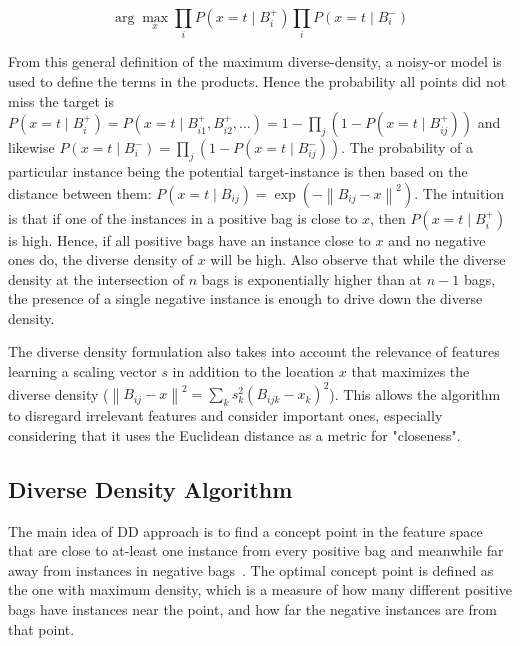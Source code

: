 \documentclass[conference,compsoc]{IEEEtran}
\begin{document}
\begin{equation}
\arg\max_x \prod_i P(x = t \mid B_i^+) \prod_i P(x = t \mid B_i^-)
\end{equation}

From this general definition of the maximum diverse-density, a noisy-or model is used to define the terms in the products. Hence the probability all points did not miss the target is $P(x = t \mid B_i^+) = P(x = t \mid B^+_{i1}, B^+_{i2}, \dots) = 1 - \prod_j(1 - P(x =t \mid B^+_{ij}))$ and likewise $P(x = t \mid B_i^-) = \prod_j(1 - P(x = t \mid B_{ij}^-))$. The probability of a particular instance being the potential target-instance is then based on the distance between them: $P(x = t \mid B_{ij}) = \exp(- \left\| B_{ij} - x \right\|^2)$. The intuition is that if one of the instances in a positive bag is close to $x$, then $P(x = t \mid B_i^+)$ is high. Hence, if all positive bags have an instance close to $x$ and no negative ones do, the diverse density of $x$ will be high. Also observe that while the diverse density at the intersection of $n$ bags is exponentially higher than at $n - 1$ bags, the presence of a single negative instance is enough to drive down the diverse density.

The diverse density formulation also takes into account the relevance of features learning a scaling vector $s$ in addition to the location $x$ that maximizes the diverse density ($\left\| B_{ij} - x \right\|^2 = \sum_k s_k^2(B_{ijk} - x_k)^2$). This allows the algorithm to disregard irrelevant features and consider important ones, especially considering that it uses the Euclidean distance as a metric for "closeness". 

\subsection{Diverse Density Algorithm}
The main idea of DD approach is to find a concept point in the feature space that are close to at-least one instance from every positive bag and meanwhile far away from instances in negative bags~\cite{MILlink}. The optimal concept point is defined as the one with maximum density, which is a measure of how many different positive bags have instances near the point, and how far the negative instances are from that point.
\end{document}
